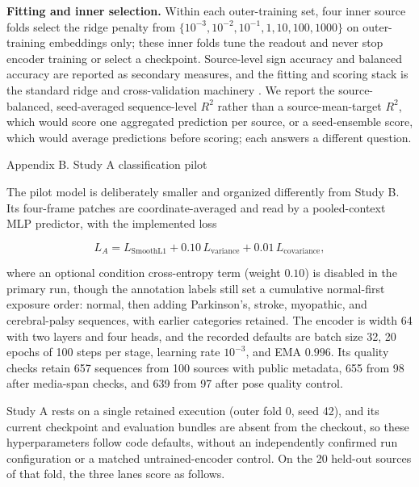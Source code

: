 \documentclass{article}
\begin{document}
\textbf{Fitting and inner selection.} Within each outer-training set,
four inner source folds select the ridge penalty from
\(\{10^{-3}, 10^{-2}, 10^{-1}, 1, 10, 100, 1000\}\) on outer-training
embeddings only; these inner folds tune the readout and never stop
encoder training or select a checkpoint. Source-level sign accuracy and
balanced accuracy \citep{brodersen2010balanced} are reported as
secondary measures, and the fitting and scoring stack is the standard
ridge and cross-validation machinery \citep{pedregosa2011scikit}. We
report the source-balanced, seed-averaged sequence-level \(R^2\) rather
than a source-mean-target \(R^2\), which would score one aggregated
prediction per source, or a seed-ensemble score, which would average
predictions before scoring; each answers a different question.

Appendix B. Study A classification pilot

The pilot model is deliberately smaller and organized differently from
Study B. Its four-frame patches are coordinate-averaged and read by a
pooled-context MLP predictor, with the implemented loss

\[
L_A = L_{\mathrm{SmoothL1}} + 0.10\,L_{\mathrm{variance}} + 0.01\,L_{\mathrm{covariance}},
\]

where an optional condition cross-entropy term (weight \(0.10\)) is
disabled in the primary run, though the annotation labels still set a
cumulative normal-first exposure order: normal, then adding Parkinson's,
stroke, myopathic, and cerebral-palsy sequences, with earlier categories
retained. The encoder is width 64 with two layers and four heads, and
the recorded defaults are batch size 32, 20 epochs of 100 steps per
stage, learning rate \(10^{-3}\), and EMA \(0.996\). Its quality checks
retain 657 sequences from 100 sources with public metadata, 655 from 98
after media-span checks, and 639 from 97 after pose quality control.

Study A rests on a single retained execution (outer fold 0, seed 42),
and its current checkpoint and evaluation bundles are absent from the
checkout, so these hyperparameters follow code defaults, without an
independently confirmed run configuration or a matched untrained-encoder
control. On the 20 held-out sources of that fold, the three lanes score
as follows.
\end{document}
